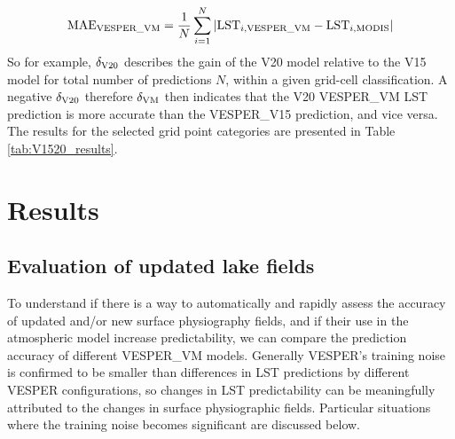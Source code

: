 \documentclass[hess, twostagejnl]{copernicus}
\providecommand{\DIFadd}[1]{{\protect\color{blue} \sf #1}} %
\providecommand{\DIFdel}[1]{{\protect\color{red} \scriptsize #1}} %
\providecommand{\DIFaddbegin}{} %
\providecommand{\DIFaddend}{} %
\providecommand{\DIFdelbegin}{} %
\providecommand{\DIFdelend}{} %
\begin{document}
\DIFdelend \DIFaddbegin \begin{equation} 
	\text{MAE}_{\rm VESPER\_VM}  = \frac{1}{N} \sum_{i=1}^{N}| \text{LST}_{i, \rm VESPER\_VM} -\text{LST}_{i, \rm MODIS} |
\end{equation}\DIFaddend 
\DIFdelbegin \DIFdel{So for example, $\delta_{\rm V20}$ describes the gain of the V20 model relative to the V15 model}\DIFdelend \DIFaddbegin \DIFadd{for total number of predictions $N$, within a given grid-cell classification}\DIFaddend . A negative \DIFdelbegin \DIFdel{$\delta_{\rm V20}$ therefore }\DIFdelend \DIFaddbegin \DIFadd{$\delta_{\rm VM}$ then }\DIFaddend indicates that the \DIFdelbegin \DIFdel{V20 }\DIFdelend \DIFaddbegin \DIFadd{VESPER\_VM LST }\DIFaddend prediction is more accurate \DIFaddbegin \DIFadd{than the  VESPER\_V15 prediction}\DIFaddend , and vice versa.
\DIFdelbegin \DIFdel{The results for the selected grid point categories are presented in Table \ref{tab:V1520_results}. }\DIFdelend \DIFaddbegin \section{\DIFadd{Results}}\label{sec:3}

\subsection{\DIFadd{Evaluation of updated lake fields}}
\DIFadd{To understand if there is a way to automatically and rapidly assess the accuracy of updated and/or new surface physiography fields, and if their use in the atmospheric model increase predictability, we can compare the prediction accuracy of different VESPER\_VM models. Generally VESPER’s training noise is confirmed to be smaller than differences in LST predictions by different VESPER configurations, so changes in LST predictability can be meaningfully attributed to the changes in surface physiographic fields. Particular situations where the training noise becomes significant are discussed below. }\DIFaddend \newline 
\end{document}

